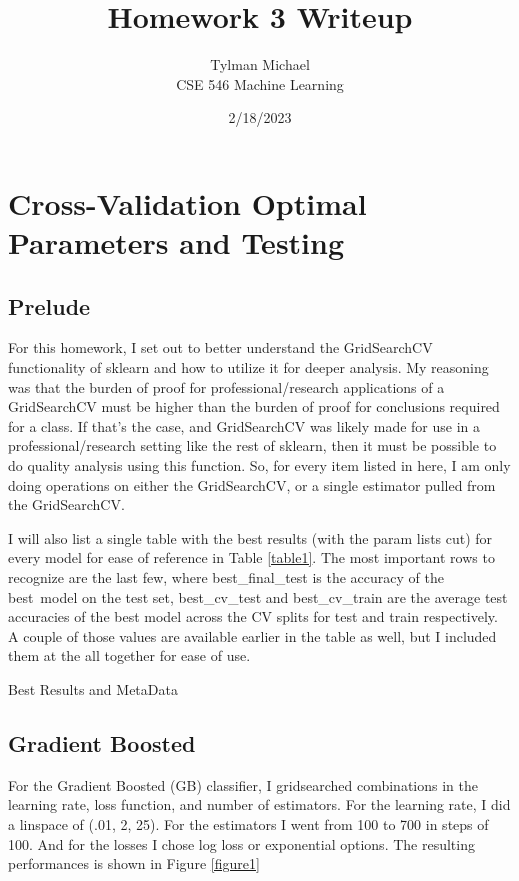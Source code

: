 \documentclass[12pt]{article}
\title{Homework 3 Writeup}
\author{Tylman Michael\\CSE 546 Machine Learning}
\date{2/18/2023}
\begin{document}
\maketitle{}
\section{Cross-Validation Optimal Parameters and Testing}
\subsection{Prelude}
For this homework, I set out to better understand the GridSearchCV functionality of sklearn and how to utilize it for 
deeper analysis. My reasoning was that the burden of proof for professional/research applications of a GridSearchCV must be higher
than the burden of proof for conclusions required for a class. If that's the case, and GridSearchCV was likely made for 
use in a professional/research setting like the rest of sklearn, then it must be possible to do quality analysis using 
this function. So, for every item listed in here, I am only doing operations on either the GridSearchCV, or a single estimator pulled
from the GridSearchCV.

I will also list a single table with the best results (with the param lists cut) for every model for ease of reference 
in Table \ref{table1}. The most important rows to recognize are the last few, where best\_final\_test is the accuracy 
of the best\ model on the test set, best\_cv\_test and best\_cv\_train are the average test accuracies of the best model
 across the CV splits for test and train respectively. A couple of those values are available earlier in the table as well,
 but I included them at the all together for ease of use.
\begin{table}
  \resizebox*{.95\textwidth}{!}{}
  \caption{Best Results and MetaData}
  \label{table1}
\end{table}

\subsection{Gradient Boosted}
For the Gradient Boosted (GB) classifier, I gridsearched combinations in the learning rate, loss function, and number of estimators.
For the learning rate, I did a linspace of (.01, 2, 25). For the estimators I went from 100 to 700 in steps of 100. And 
for the losses I chose log loss or exponential options. The resulting performances is shown in Figure \ref{figure1}
\end{document}
